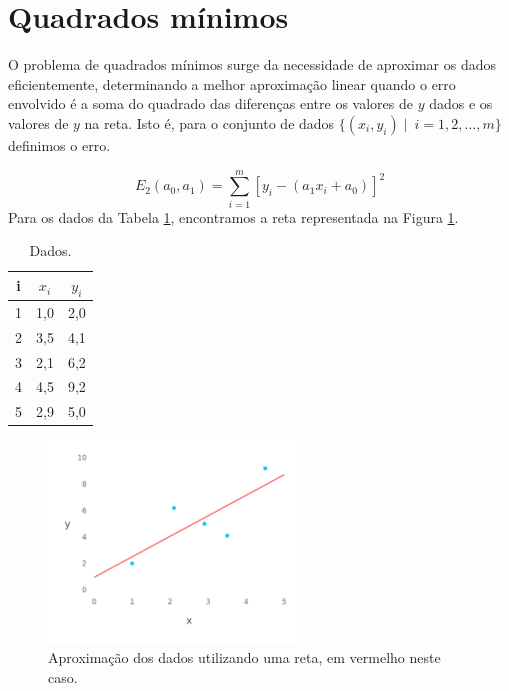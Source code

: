 \documentclass[
	12pt,				%
    oneside,			%
	a4paper,			%
	english,			%
	french,				%
	spanish,			%
	brazil,				%
	]{abntex2}
\begin{document}
    \section{Quadrados mínimos}\label{sec:minquad}

        O problema de quadrados mínimos surge da necessidade de aproximar os dados eficientemente, determinando a melhor aproximação linear quando o erro envolvido é a soma do quadrado das diferenças entre os valores de $y$ dados e os valores de $y$ na reta. Isto é, para o conjunto de dados $\{(x_i,y_i)\mid\ i=1,2,\dots,m\}$ definimos o erro.

        \begin{equation*}
            E_{2}(a_0,a_1) = \sum\limits_{i=1}^m[y_i -(a_{1}x_{i} + a_0)]^2
        \end{equation*}
        Para os dados da Tabela \ref{tab:dataretammq}, encontramos a reta representada na Figura \ref{fig:retammq}.

        \begin{table}[ht]
                \centering
                \caption{Dados.}
                \label{tab:dataretammq}
                \begin{tabular}{@{}ccc@{}}
                \toprule
                i & $x_i$ & $y_i$  \\ \midrule
                1 & 1,0  & 2,0  \\
                2 & 3,5  & 4,1 \\
                3 & 2,1  & 6,2 \\
                4 & 4,5  & 9,2 \\
                5 & 2,9  & 5,0 \\ \bottomrule
                \end{tabular}
            \end{table}

        \begin{figure}[htb]
            \centering
            \includegraphics[width=0.6\textwidth]{mmqreta.png}
            \caption{Aproximação dos dados utilizando uma reta, em vermelho neste caso.}
            \label{fig:retammq}
        \end{figure}
\end{document}
